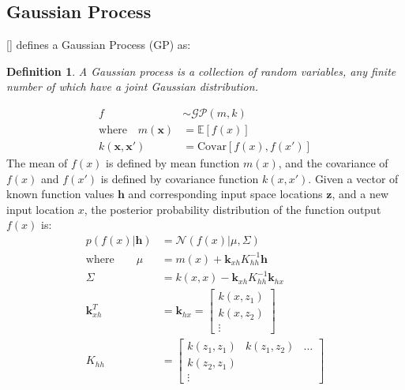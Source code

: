 \documentclass{article}
\newtheorem{definition}{Definition}[section]
\begin{document}
\subsection{Gaussian Process}
[\cite[p.13]{Gaussian-Processes-for-Machine-Learning}] defines a Gaussian Process (GP) as:
\begin{definition}
    \label{def:GP}
    A Gaussian process is a collection of random variables, any finite number of which have a joint Gaussian distribution.
\end{definition}
\begin{equation}
    \begin{aligned}
        f                                    & \sim\mathcal{GP}(m,k)
        \\
        \text{where} \quad m(\boldsymbol{x}) & =\mathbb{E} [f(x)]
        \\
        k(\boldsymbol{x},\boldsymbol{x}')    & =\text{Covar}[f(x), f(x')]
    \end{aligned}
    \label{eq:GP_def}
\end{equation}
The mean of $f(x)$ is defined by mean function $m(x)$, and the covariance of $f(x)$ and $f(x')$ is defined by covariance function $k(x,x')$. Given a vector of known function values $\boldsymbol{h}$ and corresponding input space locations $\boldsymbol{z}$, and a new input location $x$, the posterior probability distribution of the function output $f(x)$ is:
\begin{equation}
    \begin{aligned}
        p(f(x)|\boldsymbol{h})     & =\mathcal{N}(f(x)|\mu, \Sigma)           \\
        \text{where}\quad\quad\mu & =m(x) + \boldsymbol{k}_{xh}K_{hh}^{-1}\boldsymbol{h} \\
        \Sigma                    & =k(x, x)-\boldsymbol{k}_{xh}K_{hh}^{-1}\boldsymbol{k}_{hx}        \\
        \boldsymbol{k}_{xh}^T                  & =\boldsymbol{k}_{hx}=\begin{bmatrix}
                                                k(x, z_1) \\
                                                k(x, z_2) \\
                                                \vdots
                                            \end{bmatrix}                  \\
        K_{hh}                    & =\begin{bmatrix}
                                         k(z_1,z_1) & k(z_1, z_2) & \hdots \\
                                         k(z_2,z_1) &             &        \\
                                         \vdots     &             &
                                     \end{bmatrix}
    \end{aligned}
    \label{eq:GP_pred}
\end{equation}
\end{document}
